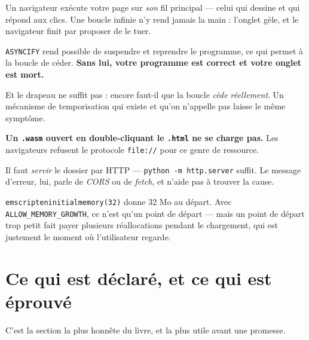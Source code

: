 \begin{nkretenir}
Un navigateur exécute votre page sur \emph{son} fil principal --- celui qui
dessine et qui répond aux clics. Une boucle infinie n'y rend jamais la main :
l'onglet gèle, et le navigateur finit par proposer de le tuer.

\texttt{ASYNCIFY} rend possible de suspendre et reprendre le programme, ce qui
permet à la boucle de céder. \textbf{Sans lui, votre programme est correct et
votre onglet est mort.}

\alerte{} Et le drapeau ne suffit pas : encore faut-il que la boucle \emph{cède
réellement}. Un mécanisme de temporisation qui existe et qu'on n'appelle pas
laisse le même symptôme.
\end{nkretenir}

\begin{nkpiege}
\textbf{Un \texttt{.wasm} ouvert en double-cliquant le \texttt{.html} ne se
charge pas.} Les navigateurs refusent le protocole \texttt{file://} pour ce genre
de ressource.

Il faut \emph{servir} le dossier par HTTP --- \texttt{python -m http.server}
suffit. Le message d'erreur, lui, parle de \emph{CORS} ou de \emph{fetch}, et
n'aide pas à trouver la cause.
\end{nkpiege}

\begin{nkretenir}
\texttt{emscripteninitialmemory(32)} donne 32 Mo au départ. Avec
\texttt{ALLOW\_MEMORY\_GROWTH}, ce n'est qu'un point de départ --- mais un point
de départ trop petit fait payer plusieurs réallocations pendant le chargement,
qui est justement le moment où l'utilisateur regarde.
\end{nkretenir}

\section{Ce qui est déclaré, et ce qui est éprouvé}

C'est la section la plus honnête du livre, et la plus utile avant une promesse.

